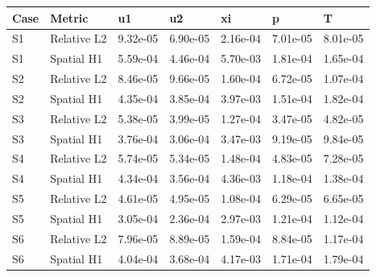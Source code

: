 \begin{tabular}{lllllll}
\hline
Case & Metric & u1 & u2 & xi & p & T \\
\hline
S1 & Relative L2 & 9.32e-05 & 6.90e-05 & 2.16e-04 & 7.01e-05 & 8.01e-05 \\
S1 & Spatial H1 & 5.59e-04 & 4.46e-04 & 5.70e-03 & 1.81e-04 & 1.65e-04 \\
S2 & Relative L2 & 8.46e-05 & 9.66e-05 & 1.60e-04 & 6.72e-05 & 1.07e-04 \\
S2 & Spatial H1 & 4.35e-04 & 3.85e-04 & 3.97e-03 & 1.51e-04 & 1.82e-04 \\
S3 & Relative L2 & 5.38e-05 & 3.99e-05 & 1.27e-04 & 3.47e-05 & 4.82e-05 \\
S3 & Spatial H1 & 3.76e-04 & 3.06e-04 & 3.47e-03 & 9.19e-05 & 9.84e-05 \\
S4 & Relative L2 & 5.74e-05 & 5.34e-05 & 1.48e-04 & 4.83e-05 & 7.28e-05 \\
S4 & Spatial H1 & 4.34e-04 & 3.56e-04 & 4.36e-03 & 1.18e-04 & 1.38e-04 \\
S5 & Relative L2 & 4.61e-05 & 4.95e-05 & 1.08e-04 & 6.29e-05 & 6.65e-05 \\
S5 & Spatial H1 & 3.05e-04 & 2.36e-04 & 2.97e-03 & 1.21e-04 & 1.12e-04 \\
S6 & Relative L2 & 7.96e-05 & 8.89e-05 & 1.59e-04 & 8.84e-05 & 1.17e-04 \\
S6 & Spatial H1 & 4.04e-04 & 3.68e-04 & 4.17e-03 & 1.71e-04 & 1.79e-04 \\
\hline
\end{tabular}
